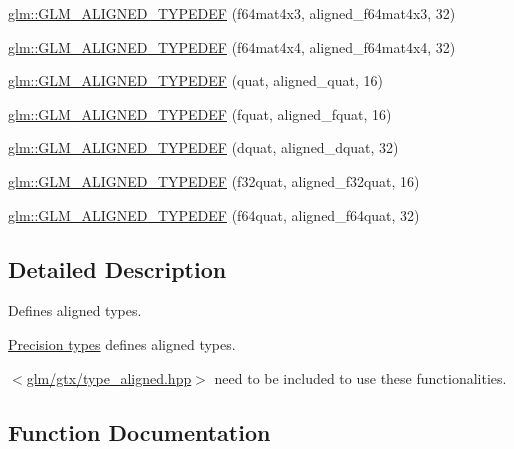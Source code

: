 \begin{DoxyCompactItemize}
\item 
\hyperlink{group__gtx__type__aligned_ga0892638d6ba773043b3d63d1d092622e}{glm\+::\+G\+L\+M\+\_\+\+A\+L\+I\+G\+N\+E\+D\+\_\+\+T\+Y\+P\+E\+D\+E\+F} (f64mat4x3, aligned\+\_\+f64mat4x3, 32)
\item 
\hyperlink{group__gtx__type__aligned_ga912a16432608b822f1e13607529934c1}{glm\+::\+G\+L\+M\+\_\+\+A\+L\+I\+G\+N\+E\+D\+\_\+\+T\+Y\+P\+E\+D\+E\+F} (f64mat4x4, aligned\+\_\+f64mat4x4, 32)
\item 
\hyperlink{group__gtx__type__aligned_gafd945a8ea86b042aba410e0560df9a3d}{glm\+::\+G\+L\+M\+\_\+\+A\+L\+I\+G\+N\+E\+D\+\_\+\+T\+Y\+P\+E\+D\+E\+F} (quat, aligned\+\_\+quat, 16)
\item 
\hyperlink{group__gtx__type__aligned_gad8c4bfacff70e57dc8303634c8bfce35}{glm\+::\+G\+L\+M\+\_\+\+A\+L\+I\+G\+N\+E\+D\+\_\+\+T\+Y\+P\+E\+D\+E\+F} (fquat, aligned\+\_\+fquat, 16)
\item 
\hyperlink{group__gtx__type__aligned_gaabc28c84a3288b697605d4688686f9a9}{glm\+::\+G\+L\+M\+\_\+\+A\+L\+I\+G\+N\+E\+D\+\_\+\+T\+Y\+P\+E\+D\+E\+F} (dquat, aligned\+\_\+dquat, 32)
\item 
\hyperlink{group__gtx__type__aligned_ga1ed8aeb5ca67fade269a46105f1bf273}{glm\+::\+G\+L\+M\+\_\+\+A\+L\+I\+G\+N\+E\+D\+\_\+\+T\+Y\+P\+E\+D\+E\+F} (f32quat, aligned\+\_\+f32quat, 16)
\item 
\hyperlink{group__gtx__type__aligned_ga95cc03b8b475993fa50e05e38e203303}{glm\+::\+G\+L\+M\+\_\+\+A\+L\+I\+G\+N\+E\+D\+\_\+\+T\+Y\+P\+E\+D\+E\+F} (f64quat, aligned\+\_\+f64quat, 32)
\end{DoxyCompactItemize}


\subsection{Detailed Description}
Defines aligned types. 

\hyperlink{group__core__precision}{Precision types} defines aligned types.

$<$\hyperlink{type__aligned_8hpp}{glm/gtx/type\+\_\+aligned.\+hpp}$>$ need to be included to use these functionalities. 

\subsection{Function Documentation}
\hypertarget{group__gtx__type__aligned_gab5cd5c5fad228b25c782084f1cc30114}{}

